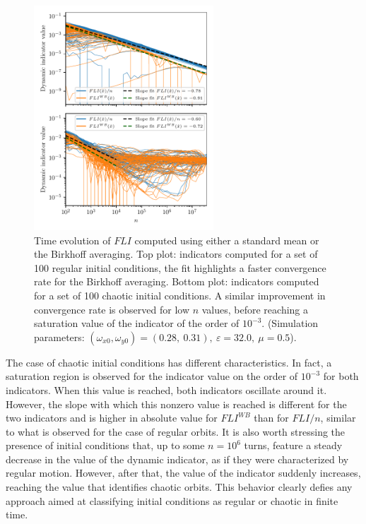 \begin{figure}[htp]
    \centering
    \includegraphics[width=0.6\textwidth]{6_dynamic_indicators/fig/lyap_birkhoff.pdf}
    \caption{Time evolution of $FLI$ computed using either a standard mean or the Birkhoff averaging. Top plot: indicators computed for a set of 100 regular initial conditions, the fit highlights a faster convergence rate for the Birkhoff averaging. Bottom plot: indicators computed for a set of 100 chaotic initial conditions. A similar improvement in convergence rate is observed for low $n$ values, before reaching a saturation value of the indicator of the order of $10^{-3}$. (Simulation parameters: $(\omega_{x0},\omega_{y0})= (0.28,\ 0.31),\ \varepsilon=32.0,\ \mu=0.5$).}
    \label{fig:fli_compare_mean_birk}
\end{figure}

The case of chaotic initial conditions has different characteristics. In fact, a saturation region is observed for the indicator value on the order of $10^{-3}$ for both indicators. When this value is reached, both indicators oscillate around it. However, the slope with which this nonzero value is reached is different for the two indicators and is higher in absolute value for $FLI^{WB}$ than for $FLI/n$, similar to what is observed for the case of regular orbits. It is also worth stressing the presence of initial conditions that, up to some $n=10^6$ turns, feature a steady decrease in the value of the dynamic indicator, as if they were characterized by regular motion. However, after that, the value of the indicator suddenly increases, reaching the value that identifies chaotic orbits. This behavior clearly defies any approach aimed at classifying initial conditions as regular or chaotic in finite time. 

